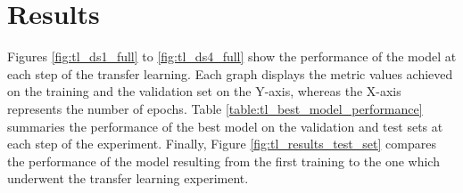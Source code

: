 \section{Results}

%
%
%


\setlength{\marginparwidth}{3cm}\leavevmode {}Figures \ref{fig:tl_ds1_full} to \ref{fig:tl_ds4_full} show the performance of the model at each step of the transfer learning. Each graph displays the metric values achieved on the training and the validation set on the Y-axis, whereas the X-axis represents the number of epochs.
Table \ref{table:tl_best_model_performance} summaries the performance of the best model on the validation and test sets at each step of the experiment. 
Finally, Figure \ref{fig:tl_results_test_set} compares the performance of the model resulting from the first training to the one which underwent the transfer learning experiment. 

\newpage 

